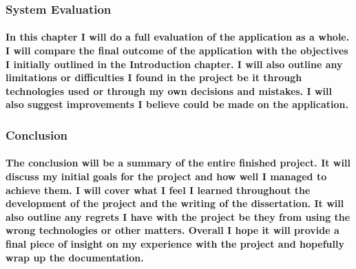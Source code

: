     \subsubsection{System Evaluation}
    \paragraph{In this chapter I will do a full evaluation of the application as a whole. I will compare the final outcome of the application with the objectives I initially outlined in the Introduction chapter. I will also outline any limitations or difficulties I found in the project be it through technologies used or through my own decisions and mistakes. I will also suggest improvements I believe could be made on the application.}
    \subsubsection{Conclusion}
    \paragraph{The conclusion will be a summary of the entire finished project. It will discuss my initial goals for the project and how well I managed to achieve them. I will cover what I feel I learned throughout the development of the project and the writing of the dissertation. It will also outline any regrets I have with the project be they from using the wrong technologies or other matters. Overall I hope it will provide a final piece of insight on my experience with the project and hopefully wrap up the documentation.}